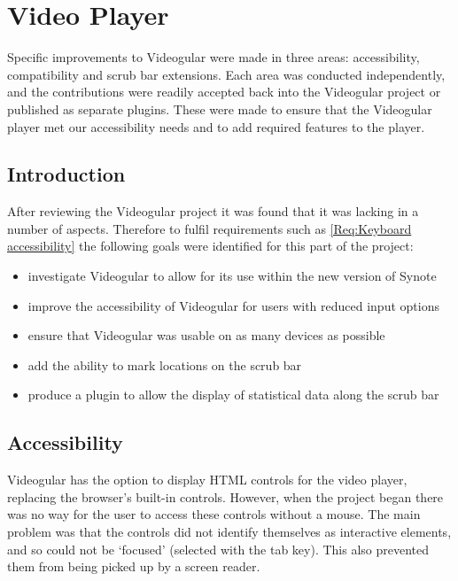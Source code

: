 
\chapter{Video Player}
\label{Chapter:Video Player}

\begin{preamble}
	Specific improvements to \gls{Videogular} were made in three areas: accessibility, compatibility and scrub bar extensions. Each area was conducted independently, and the contributions were readily accepted back into the \gls{Videogular} project or published as separate plugins. These were made to ensure that the \gls{Videogular} player met our accessibility needs and to add required features to the player.
\end{preamble}

\section{Introduction}

After reviewing the \gls{Videogular} project it was found that it was lacking in a number of aspects. Therefore to fulfil requirements such as \cref{Req:Keyboard accessibility} the following goals were identified for this part of the project:

\begin{itemize}
	\item investigate \gls{Videogular} to allow for its use within the new version of Synote
	\item improve the accessibility of \gls{Videogular} for users with reduced input options
	\item ensure that \gls{Videogular} was usable on as many devices as possible
	\item add the ability to mark locations on the \gls{scrub bar}
	\item produce a plugin to allow the display of statistical data along the \gls{scrub bar}
\end{itemize}

\section{Accessibility}
\label{Section:Accessibility}
\gls{Videogular} has the option to display HTML controls for the video player, replacing the browser's built-in controls. However, when the project began there was no way for the user to access these controls without a mouse. The main problem was that the controls did not identify themselves as interactive elements, and so could not be `focused' (selected with the tab key). This also prevented them from being picked up by a screen reader.

